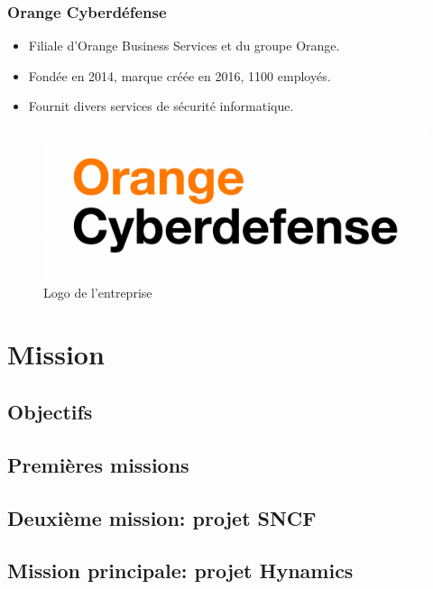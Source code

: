 \documentclass[french, a4paper]{beamer}
\begin{document}
\begin{frame}
    \frametitle{Orange Cyberdéfense}
    \begin{minipage}{0.5\textwidth}
        \begin{itemize}
            \item Filiale d'Orange Business Services et du groupe Orange.
            \item Fondée en 2014, marque créée en 2016, 1100 employés.
            \item Fournit divers services de sécurité informatique.
        \end{itemize}
    \end{minipage}%
    \hfill
    \begin{minipage}{0.5\textwidth}
        \begin{figure}[h!]
            \centering
            \includegraphics[width = \linewidth]{img/logo/ocd.png}
            \caption{Logo de l'entreprise}%
            \label{fig:logo/ocd}
        \end{figure}
    \end{minipage}
\end{frame}


\section{Mission}
\subsection{Objectifs}
\subsection{Premières missions}
\subsection{Deuxième mission: projet SNCF}
\subsection{Mission principale: projet Hynamics}
\end{document}
